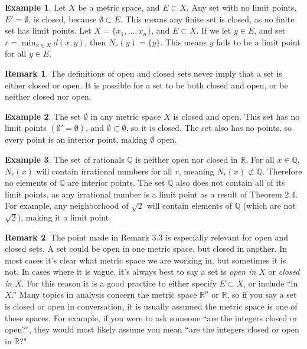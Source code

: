 \documentclass{article}
\newcommand{\R}{\mathbb{R}}
\newcommand{\Q}{\mathbb{Q}}
\theoremstyle{definition}
\newtheorem{example}{Example}[section]
\newtheorem{remark}{Remark}[section]
\begin{document}
\begin{example}
Let $ X $ be a metric space, and $ E\subset X $. Any set with no limit points, $ E'=\emptyset $, is closed, because $ \emptyset\subset E $. This means any finite set is closed, as no finite set has limit points. Let $ X=\{x_1,\ldots, x_n\} $, and $ E\subset X $. If we let $ y\in E $, and set $ r=\min_{x\in X}d(x,y) $, then $ N_r(y)=\{y\} $. This means $ y $ fails to be a limit point for all $ y\in E $.
\end{example}
\begin{remark}
	The definitions of open and closed sets never imply that a set is either closed or open. It is possible for a set to be both closed and open, or be neither closed nor open.
\end{remark}
\begin{example}
The set $ \emptyset $ in any metric space $ X $ is closed and open. This set has no limit points $ (\emptyset'=\emptyset) $, and $ \emptyset\subset\emptyset $, so it is closed. The set also has no points, so every point is an interior point, making $ \emptyset $ open. 
\end{example}
\begin{example}
The set of rationals $ \Q $ is neither open nor closed in $ \R $. For all $ x\in\Q $, $ N_r(x) $ will contain irrational numbers for all $ r $, meaning $ N_r(x)\not\subset\Q $. Therefore no elements of $ \Q $ are interior points. The set $ \Q $ also does not contain all of its limit points, as any irrational number is a limit point as a result of Theorem 2.4. For example, any neighborhood of $ \sqrt{2} $ will contain elements of $ \Q $ (which are not $ \sqrt{2} $), making it a limit point. 
\end{example}
\begin{remark}
	The point made in Remark 3.3 is especially relevant for open and closed sets. A set could be open in one metric space, but closed in another. In most cases it's clear what metric space we are working in, but sometimes it is not. In cases where it is vague, it's always best to say a set is \textit{open in $ X $} or \textit{closed in $ X $}. For this reason it is a good practice to either specify $ E\subset X $, or include ``in $ X $.'' Many topics in analysis concern the metric space $ \R^n $ or $ \R $, so if you say a set is closed or open in conversation, it is usually assumed the metric space is one of these spaces. For example, if you were to ask someone ``are the integers closed or open?", they would most likely assume you mean ``are the integers closed or open in $ \R $?" 
\end{remark}
\end{document}
